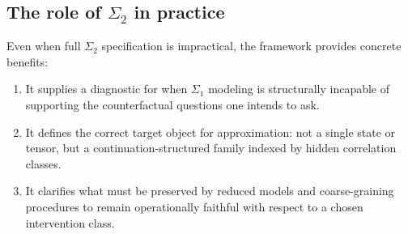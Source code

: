 \subsection{The role of \texorpdfstring{$\Sigma_2$}{Sigma-2} in practice}

Even when full $\Sigma_2$ specification is impractical, the framework provides concrete benefits:
\begin{enumerate}
\item It supplies a diagnostic for when $\Sigma_1$ modeling is structurally incapable of supporting the
      counterfactual questions one intends to ask.
\item It defines the correct target object for approximation: not a single state or tensor, but a
      continuation-structured family indexed by hidden correlation classes.
\item It clarifies what must be preserved by reduced models and coarse-graining procedures to remain
      operationally faithful with respect to a chosen intervention class.
\end{enumerate}